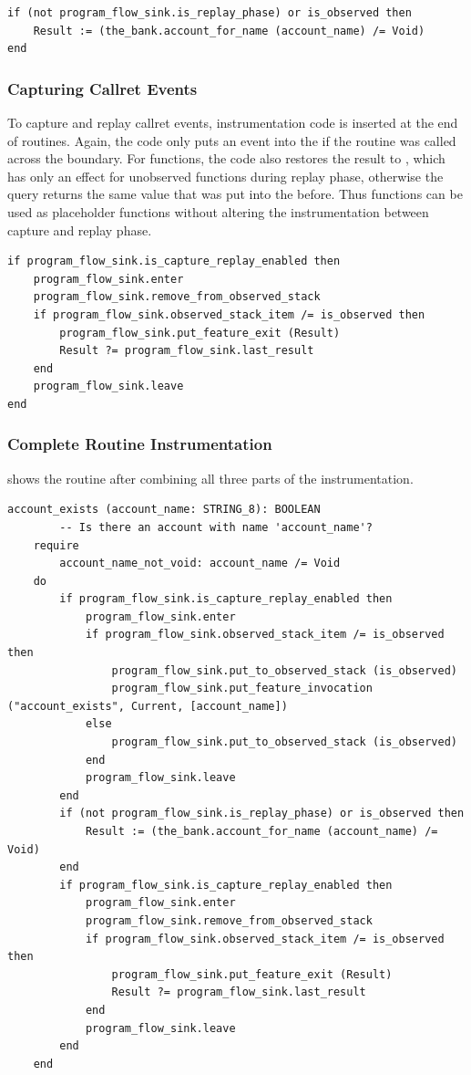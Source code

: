 \begin{lstlisting}[caption=Conditional Methodbody,label=lst:methodbody_instrumentation]
if (not program_flow_sink.is_replay_phase) or is_observed then
	Result := (the_bank.account_for_name (account_name) /= Void)
end
\end{lstlisting}


\subsubsection{Capturing Callret Events}
To capture and replay callret events, instrumentation code is inserted at the end of routines. Again, the code only puts an event into the  if the routine was called across the boundary. For functions, the code also restores the result to , which has only an effect for unobserved functions during replay phase, otherwise the query  returns the same value that was put into the  before. Thus functions can be used as placeholder functions without altering the instrumentation between capture and replay phase.
\begin{lstlisting}[caption=Instrumentation to Capture Callret Events,label=lst:exit_instrumentation]
if program_flow_sink.is_capture_replay_enabled then
	program_flow_sink.enter
	program_flow_sink.remove_from_observed_stack
	if program_flow_sink.observed_stack_item /= is_observed then
		program_flow_sink.put_feature_exit (Result)
		Result ?= program_flow_sink.last_result
	end
	program_flow_sink.leave
end
\end{lstlisting}


\subsubsection{Complete Routine Instrumentation}
 shows the routine after combining all three parts of the instrumentation.
\begin{lstlisting}[caption=Routine \feature{account\_exists} After Instrumentation,label=lst:account_exists_instrumented]
account_exists (account_name: STRING_8): BOOLEAN
		-- Is there an account with name 'account_name'?
	require
		account_name_not_void: account_name /= Void
	do
		if program_flow_sink.is_capture_replay_enabled then
			program_flow_sink.enter
			if program_flow_sink.observed_stack_item /= is_observed then
				program_flow_sink.put_to_observed_stack (is_observed)
				program_flow_sink.put_feature_invocation ("account_exists", Current, [account_name])
			else
				program_flow_sink.put_to_observed_stack (is_observed)
			end
			program_flow_sink.leave
		end
		if (not program_flow_sink.is_replay_phase) or is_observed then
			Result := (the_bank.account_for_name (account_name) /= Void)
		end
		if program_flow_sink.is_capture_replay_enabled then
			program_flow_sink.enter
			program_flow_sink.remove_from_observed_stack
			if program_flow_sink.observed_stack_item /= is_observed then
				program_flow_sink.put_feature_exit (Result)
				Result ?= program_flow_sink.last_result
			end
			program_flow_sink.leave
		end
	end
\end{lstlisting}


